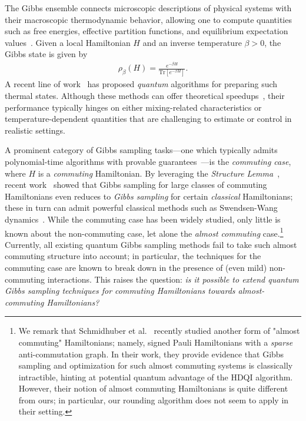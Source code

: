 \documentclass[a4paper,onecolumn,11pt]{quantumarticle}
\theoremstyle{plain}
\begin{document}
The Gibbs ensemble connects microscopic descriptions of physical systems with their macroscopic thermodynamic behavior, allowing one to compute quantities such as free energies, effective partition functions, and equilibrium expectation values~\cite{PathriaBeale2011,Chandler1987,Callen1985,LandauLifshitz1980,Sachdev2011,AltlandSimons2010,Mermin1965,Tuckerman2010,LandauBinder2014}. Given a local Hamiltonian $H$ and an inverse temperature $\beta > 0$, the Gibbs state is given by
\begin{align}\label{eq:gibbs-ex}
\rho_\beta(H) = \frac{e^{-\beta H}}{\mathrm{Tr}\left[e^{-\beta 
H}\right]}.
\end{align}
A recent line of work~\cite{Temme_2011,GilyenThermal23a,chen2023efficient,BCL24,rajakumar2024gibbs} has proposed \textit{quantum} algorithms for preparing such thermal states. Although these methods can offer theoretical speedups~\cite{BCL24,rajakumar2024gibbs}, their performance typically hinges on either mixing-related characteristics or temperature-dependent quantities that are challenging to estimate or control in realistic settings.

A prominent category of Gibbs sampling tasks---one which typically admits polynomial-time algorithms with provable guarantees~\cite{hwang2025gibbsstatepreparationcommuting,schmidhuber2025hamiltoniandecodedquantuminterferometry}---is the \emph{commuting case}, where $H$ is a \emph{commuting} Hamiltonian.
By leveraging the \emph{Structure 
Lemma}~\cite{bravyi2004commutativeversionklocalhamiltonian}, recent 
work~\cite{hwang2025gibbsstatepreparationcommuting} showed that Gibbs 
sampling for large classes of commuting Hamiltonians even reduces to 
\emph{Gibbs sampling} for certain \emph{classical} Hamiltonians; these 
in turn can admit powerful classical methods such as Swendsen-Wang 
dynamics~\cite{PhysRevLett.58.86,feng2022swendsenwangdynamicsferromagneticising}. While the commuting case has been widely studied, only little is known about the non-commuting case, let alone the \emph{almost commuting} case.\footnote{
We remark that Schmidhuber et 
al.~\cite{schmidhuber2025hamiltoniandecodedquantuminterferometry} 
recently studied another form of "almost commuting" Hamiltonians;
namely, signed Pauli Hamiltonians with a \emph{sparse} anti-commutation 
graph. In their work, they provide evidence that Gibbs sampling and 
optimization for such almost commuting 
systems is classically intractible, hinting at potential quantum 
advantage of the HDQI algorithm.
However, their notion of almost commuting Hamiltonians is quite different from 
ours; in particular, our rounding algorithm does not seem to apply in their setting.
}
Currently, all existing quantum Gibbs sampling methods fail to take 
such almost commuting structure into account; in particular, the 
techniques for the commuting case are known to break down in the presence of (even mild) non-commuting interactions. This raises the question: 
\emph{is it possible to extend quantum Gibbs sampling techniques for commuting Hamiltonians towards almost-commuting Hamiltonians?}
\end{document}
